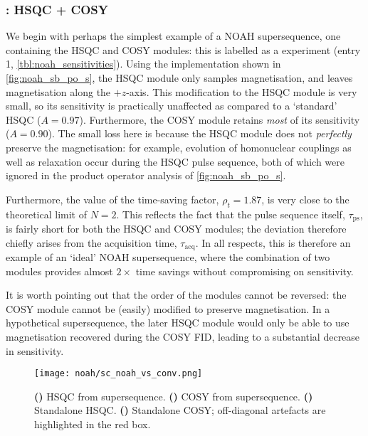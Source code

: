 \subsubsection{: HSQC + COSY}

We begin with perhaps the simplest example of a NOAH supersequence, one containing the HSQC and COSY modules: this is labelled as a  experiment (entry 1, \cref{tbl:noah_sensitivities}).
Using the implementation shown in \cref{fig:noah_sb_po_s}, the HSQC module only samples  magnetisation, and leaves  magnetisation along the $+z$-axis.
This modification to the HSQC module is very small, so its sensitivity is practically unaffected as compared to a `standard' HSQC ($A = 0.97$).
Furthermore, the COSY module retains \textit{most} of its sensitivity ($A = 0.90$).
The small loss here is because the HSQC module does not \textit{perfectly} preserve the  magnetisation: for example, evolution of homonuclear couplings as well as relaxation occur during the HSQC pulse sequence, both of which were ignored in the product operator analysis of \cref{fig:noah_sb_po_s}.

Furthermore, the value of the time-saving factor, $\rho_t = 1.87$, is very close to the theoretical limit of $N = 2$.
This reflects the fact that the pulse sequence itself, $\tau_\text{ps}$, is fairly short for both the HSQC and COSY modules; the deviation therefore chiefly arises from the acquisition time, $\tau_\text{acq}$.
In all respects, this is therefore an example of an `ideal' NOAH supersequence, where the combination of two modules provides almost $2\times$ time savings without compromising on sensitivity.

It is worth pointing out that the order of the modules cannot be reversed: the COSY module cannot be (easily) modified to preserve  magnetisation.
In a hypothetical  supersequence, the later HSQC module would only be able to use magnetisation recovered during the COSY FID, leading to a substantial decrease in sensitivity.

\begin{figure}[!ht]
    \centering
    \texttt{[image: noah/sc\_noah\_vs\_conv.png]}%
    {\label{fig:sc_noah_vs_conv_noah_s}}%
    {\label{fig:sc_noah_vs_conv_noah_c}}%
    {\label{fig:sc_noah_vs_conv_conv_s}}%
    {\label{fig:sc_noah_vs_conv_conv_c}}%
    \caption[Comparison of spectra obtained from  and standalone experiments]{
        \textbf{()} HSQC from  supersequence.
        \textbf{()} COSY from  supersequence.
        \textbf{()} Standalone HSQC.
        \textbf{()} Standalone COSY; off-diagonal artefacts are highlighted in the red box.
    }
    \label{fig:sc_noah_vs_conv}
\end{figure}

